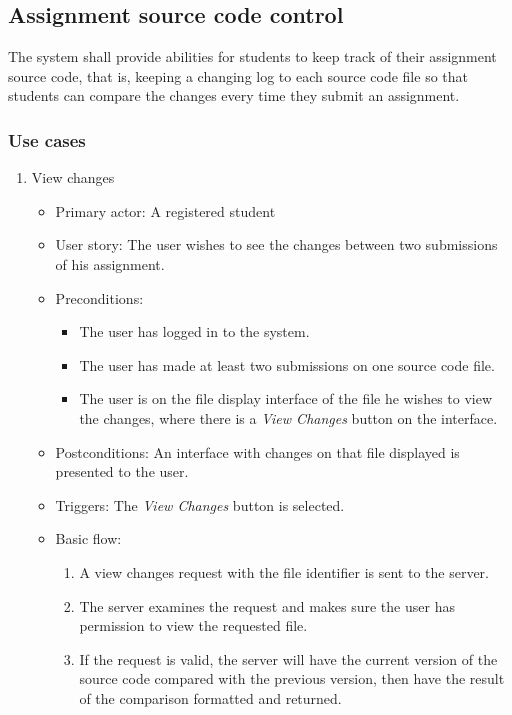 \subsection{Assignment source code control}
The system shall provide abilities for students to keep track of their
assignment source code, that is, keeping a changing log to each source code
file so that students can compare the changes every time they submit an
assignment.

\subsubsection{Use cases}
\begin{enumerate}
\item View changes
\begin{itemize}
    \item Primary actor: A registered student
    \item User story: The user wishes to see the changes between two
        submissions of his assignment.
    \item Preconditions:
        \begin{itemize}
            \item The user has logged in to the system.
            \item The user has made at least two submissions on one source code
                file.
            \item The user is on the file display interface of the file he
                wishes to view the changes, where there is a \emph{View Changes}
                button on the interface.
        \end{itemize}
    \item Postconditions:
        An interface with changes on that file displayed is presented to the
        user.
    \item Triggers:
        The \emph{View Changes} button is selected.
    \item Basic flow:
        \begin{enumerate}
            \item A view changes request with the file identifier is sent
                to the server.
            \item The server examines the request and makes sure the user has
                permission to view the requested file.
            \item If the request is valid, the server will have the current
                version of the source code compared with the previous version,
                then have the result of the comparison formatted and
                returned.
        \end{enumerate}
\end{itemize}
\end{enumerate}

